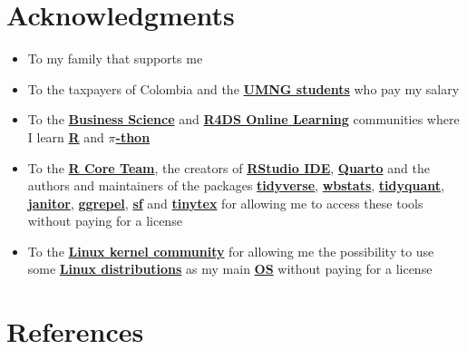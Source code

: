 \documentclass[
  ignorenonframetext,
]{beamer}
\begin{document}
\section{Acknowledgments}\label{acknowledgments}

\begin{frame}{}
\label{section-15}
\begin{itemize}
\item
  To my family that supports me
\item
  To the taxpayers of Colombia and the
  \href{https://www.umng.edu.co/estudiante}{\textbf{UMNG students}} who
  pay my salary
\item
  To the \href{https://www.business-science.io/}{\textbf{Business
  Science}} and \href{https://www.rfordatasci.com/}{\textbf{R4DS Online
  Learning}} communities where I learn
  \href{https://www.r-project.org/about.html}{\textbf{R}} and
  \href{https://www.python.org/about/}{\textbf{\(\pi\)-thon}}
\item
  To the \href{https://www.r-project.org/contributors.html}{\textbf{R
  Core Team}}, the creators of
  \href{https://rstudio.com/products/rstudio/}{\textbf{RStudio IDE}},
  \href{https://quarto.org/}{\textbf{Quarto}} and the authors and
  maintainers of the packages
  \href{https://CRAN.R-project.org/package=tidyverse}{\textbf{tidyverse}},
  \href{https://CRAN.R-project.org/package=wbstats}{\textbf{wbstats}},
  \href{https://CRAN.R-project.org/package=tidyquant}{\textbf{tidyquant}},
  \href{https://CRAN.R-project.org/package=janitor}{\textbf{janitor}},
  \href{https://CRAN.R-project.org/package=ggrepel}{\textbf{ggrepel}},
  \href{https://CRAN.R-project.org/package=sf}{\textbf{sf}} and
  \href{https://CRAN.R-project.org/package=tinytex}{\textbf{tinytex}}
  for allowing me to access these tools without paying for a license
\item
  To the \href{https://www.kernel.org/category/about.html}{\textbf{Linux
  kernel community}} for allowing me the possibility to use some
  \href{https://static.lwn.net/Distributions/}{\textbf{Linux
  distributions}} as my main
  \href{https://en.wikipedia.org/wiki/Operating_system}{\textbf{OS}}
  without paying for a license
\end{itemize}
\end{frame}

\section*{References}\label{references}
\end{document}
